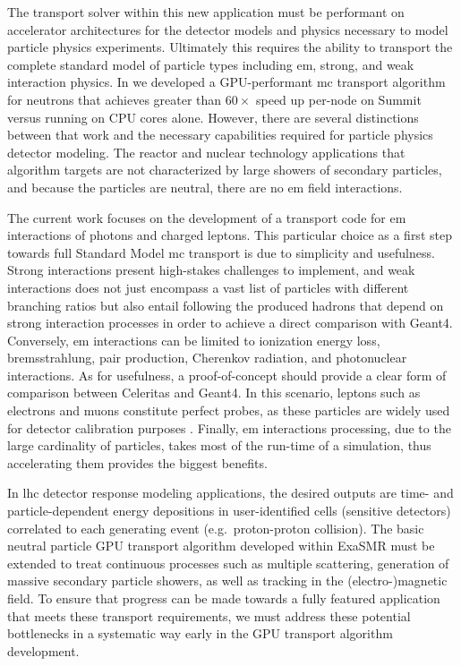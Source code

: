 \documentclass[10pt]{article}
\begin{document}
The transport solver within this new application must be performant on
accelerator architectures for the detector models and physics necessary to model
particle physics experiments. Ultimately this requires the ability to transport
the complete standard model of particle types including \ac{em}, strong, and
weak interaction physics. In \textcite{hamilton_continuous-energy_2019} we
developed a GPU-performant \ac{mc} transport algorithm for neutrons that
achieves greater than $60\times$ speed up per-node on Summit versus running on
CPU cores alone. However, there are several distinctions between that work and
the necessary capabilities required for particle physics detector modeling. The
reactor and nuclear technology applications that algorithm targets are not
characterized by large showers of secondary particles, and because the particles
are neutral, there are no \ac{em} field interactions.

The current work focuses on the development of a transport code for
\ac{em} interactions of photons and charged leptons. This particular
choice as a first step towards full Standard Model \ac{mc} transport is due to
simplicity and usefulness. Strong interactions present high-stakes challenges to
implement, and weak interactions does not just encompass a vast list of
particles with different branching ratios but also entail following the produced
hadrons that depend on strong interaction processes in order to achieve a direct
comparison with Geant4. Conversely, \ac{em} interactions can be limited
to ionization energy loss, bremsstrahlung, pair production, Cherenkov radiation,
and photonuclear interactions. As for usefulness, a proof-of-concept should
provide a clear form of comparison between Celeritas and Geant4. In this
scenario, leptons such as electrons and muons constitute perfect probes, as
these particles are widely used for detector calibration purposes
\cite{atlas_calibration_e,atlas_calibration_mu}.  Finally, \ac{em}
interactions processing, due to the large cardinality of particles, takes most
of the run-time of a simulation, thus accelerating them provides the biggest
benefits.

In \ac{lhc} detector response modeling applications, the desired outputs are
time- and particle-dependent energy depositions in user-identified cells
(sensitive detectors) correlated to each generating event (e.g.~proton-proton
collision). The basic neutral particle GPU transport algorithm developed within
ExaSMR must be extended to treat continuous processes such as multiple
scattering, generation of massive secondary particle showers, as well as
tracking in the (electro-)magnetic field. To ensure that progress can be made
towards a fully featured application that meets these transport requirements, we
must address these potential bottlenecks in a systematic way early in the GPU
transport algorithm development.
\end{document}
